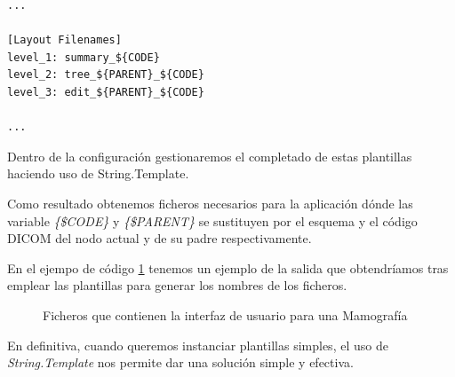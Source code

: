 \begin{lstlisting}[label=filesTemplate,caption=Sección de la configuración con los nombres de los ficheros]
...

[Layout Filenames]
level_1: summary_${CODE}
level_2: tree_${PARENT}_${CODE}
level_3: edit_${PARENT}_${CODE}

...
\end{lstlisting}

Dentro de la configuración gestionaremos el completado de estas plantillas haciendo uso de String.Template.\par
Como resultado obtenemos ficheros necesarios para la aplicación dónde las variable \emph{\{\$CODE\}} y \emph{\{\$PARENT\}} se sustituyen por el esquema y el código DICOM del nodo actual y de su padre respectivamente.\par
En el ejempo de código \ref{tree:layoutTemplate} tenemos un ejemplo de la salida que obtendríamos tras emplear las plantillas para generar los  nombres de los ficheros.\par

\begin{figure}

\centering
{}
\caption{Ficheros que contienen la interfaz de usuario para una Mamografía}
\label{tree:layoutTemplate}
\end{figure}
En definitiva, cuando queremos instanciar plantillas simples, el uso de \emph{String.Template} nos permite dar una solución simple y efectiva.\par

